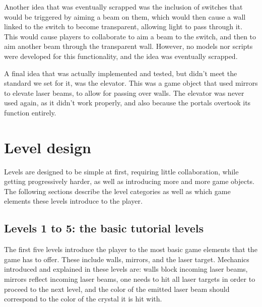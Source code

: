 			Another idea that was eventually scrapped was the inclusion of
			switches that would be triggered by aiming a beam on them, which
			would then cause a wall linked to the switch to become transparent,
			allowing light to pass through it. This would cause players to
			collaborate to aim a beam to the switch, and then to aim another
			beam through the transparent wall. However, no models nor scripts
			were developed for this functionality, and the idea was eventually
			scrapped.
			
			A final idea that was actually implemented and tested, but didn't
			meet the standard we set for it, was the elevator. This was a
			game object that used mirrors to elevate laser beams, to allow for
			passing over walls. The elevator was never used again, as it didn't
			work properly, and also because the portals overtook its function
			entirely.
			
	\section{Level design} \label{sec:leveldesign}
		Levels are designed to be simple at first, requiring little collaboration,
		while getting progressively harder, as well as introducing more and more
		game objects. The following sections describe the level categories as
		well as which game elements these levels introduce to the player.

		\subsection{Levels 1 to 5: the basic tutorial levels} \label{ssec:basiclevels}
			The first five levels introduce the player to the most basic game
			elements that the game has to offer. These include walls, mirrors,
			and the laser target. Mechanics introduced and explained in these
			levels are: walls block incoming laser beams, mirrors reflect
			incoming laser beams, one needs to hit all laser targets in order
			to proceed to the next level, and the color of the emitted laser
			beam should correspond to the color of the crystal it is hit with.
			
